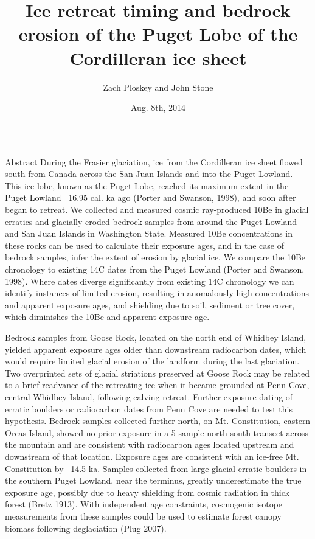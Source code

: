 \documentclass{beamer}
\title{Ice retreat timing and bedrock erosion of the Puget Lobe of the Cordilleran ice sheet}
\author{Zach Ploskey and John Stone}
\institute{Cosmogenic Nuclide Lab, Dept. of Earth and Space Sciences, University of Washington, Seattle}
\date{Aug. 8th, 2014}
\begin{document}
\begin{frame}{}\centering

\begin{columns}[T]

\begin{column}{0.32\columnwidth}

\begin{block}{Abstract}	
During the Frasier glaciation, ice from the Cordilleran ice sheet flowed south from Canada across the San Juan Islands and into the Puget Lowland. This ice lobe, known as the Puget Lobe, reached its maximum extent in the Puget Lowland ~16.95 cal. ka ago  (Porter and Swanson, 1998), and soon after began to retreat. We collected and measured cosmic ray-produced 10Be in glacial erratics and glacially eroded bedrock samples from around the Puget Lowland and San Juan Islands in Washington State. Measured 10Be concentrations in these rocks can be used to calculate their exposure ages, and in the case of bedrock samples, infer the extent of erosion by glacial ice. We compare the 10Be chronology to existing 14C dates from the Puget Lowland (Porter and Swanson, 1998). Where dates diverge significantly from existing 14C chronology we can identify instances of limited erosion, resulting in anomalously high concentrations and apparent exposure ages, and shielding due to soil, sediment or tree cover, which diminishes the 10Be and apparent exposure age.

Bedrock samples from Goose  Rock, located on the north end of Whidbey Island, yielded apparent exposure ages older than downstream radiocarbon dates, which would require limited glacial erosion of the landform during the last glaciation. Two overprinted sets of glacial striations preserved at Goose Rock may be related to a brief readvance of the retreating ice when it became grounded at Penn Cove, central Whidbey Island, following calving retreat. Further exposure dating of erratic boulders or radiocarbon dates from Penn Cove are needed to test this hypothesis. Bedrock samples collected further north, on Mt. Constitution, eastern Orcas Island, showed no prior exposure in a 5-sample north-south transect across the mountain and are consistent with radiocarbon ages located upstream and downstream of that location. Exposure ages are consistent with an ice-free Mt. Constitution by ~14.5 ka. Samples collected from large glacial erratic boulders in the southern Puget Lowland, near the terminus, greatly underestimate the true exposure age, possibly due to heavy shielding from cosmic radiation in thick forest (Bretz 1913). With independent age constraints, cosmogenic isotope measurements from these samples could be used to estimate forest canopy biomass following deglaciation (Plug 2007).


\end{block}
\end{column}
\end{columns}
\end{frame}
\end{document}
